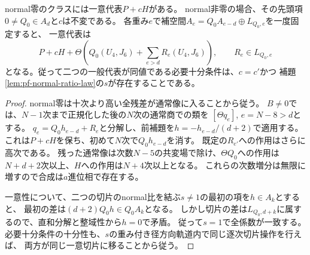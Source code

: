 \begin{theorem}[全普遍形式接触同型類の一意切片]
\label{thm:pf-unique-contact-slice}
normal零のクラスには一意代表$P+cH$がある。
normal非零の場合、その先頭項$0\ne Q_0\in A_d$と$c$は不変である。
各重み$e$で補空間$A_e=Q_0A_{e-d}\oplus L_{Q_0,e}$を一度固定すると、
一意代表は
\[
 P+cH+\Theta\left(Q_0(U_4,J_6)+\sum_{e>d}R_e(U_4,J_6)\right),
 \qquad R_e\in L_{Q_0,e}
\]
となる。従って二つの一般代表が同値である必要十分条件は、$c=c'$かつ
補題\ref{lem:pf-normal-ratio-law}の$s$が存在することである。
\end{theorem}
\begin{proof}
normal零は十次より高い全残差が通常像に入ることから従う。
$B\ne0$では、$N-1$次まで正規化した後の$N$次の通常商での類を
$[\Theta q_e]$, $e=N-8>d$とする。
$q_e=Q_0h_{e-d}+R_e$と分解し、前補題を$h=-h_{e-d}/(d+2)$で適用する。
これは$P+cH$を保ち、初めて$N$次で$Q_0h_{e-d}$を消す。
既定の$R_{e'}$への作用はさらに高次である。
残った通常像は次数$N-5$の共変場で除け、$\Theta Q_0$への作用は
$N+d+2$次以上、$H$への作用は$N+4$次以上となる。
これらの次数増分は無限に増すので合成は$a$進位相で存在する。

一意性について、二つの切片のnormal比を結ぶ$s\ne1$の最初の項を$h\in A_k$とすると、
最初の差は$(d+2)Q_0h\in Q_0A_k$となる。
しかし切片の差は$L_{Q_0,d+k}$に属するので、直和分解と整域性から$h=0$で矛盾。
従って$s=1$で全係数が一致する。
必要十分条件の十分性も、$s$の重み付き径方向軌道内で同じ逐次切片操作を行えば、
両方が同じ一意切片に移ることから従う。
\end{proof}

